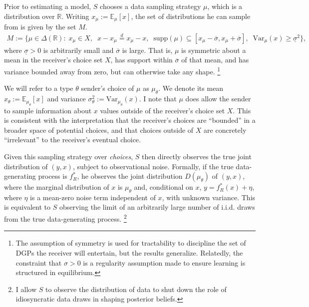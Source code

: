 \documentclass[11pt,dvipsnames]{article}
\newcommand{\Var}{\mathrm{Var}}
\begin{document}
Prior to estimating a model, $S$ chooses a data sampling strategy $\mu$, which is a distribution over $\mathbb{R}$.
Writing $x_\mu := \mathbb{E}_\mu[x]$, the set of distributions he can sample from is given by the set $M$.
\begin{align*}
M := \Big\{\mu \in \Delta(\mathbb{R}) : \; x_\mu \in X,\;\; x - x_\mu \overset{d}{=} x_\mu - x,\;\; \mathrm{supp}(\mu)\subseteq[x_\mu-\overline{\sigma},x_\mu+\overline{\sigma}],\;\; \Var_\mu(x) \geq \underline{\sigma}^2 \Big\},
\end{align*}
where $\underline{\sigma}>0$ is arbitrarily small and $\overline{\sigma}$ is large.
That is, $\mu$ is symmetric about a mean in the receiver's choice set $X$, has support within $\overline{\sigma}$ of that mean, and has variance bounded away from zero, but can otherwise take any shape.
\footnote{The assumption of symmetry is used for tractability to discipline the set of DGPs the receiver will entertain, but the results generalize. Relatedly, the constraint that $\sigma>0$ is a regularity assumption made to ensure learning is structured in equilibrium.}

We will refer to a type $\theta$ sender's choice of $\mu$ as $\mu_\theta$. We denote its mean $x_\theta := \mathbb{E}_{\mu_\theta}[x]$ and variance $\sigma_\theta^2:=\Var_{\mu_\theta}(x)$.
I note that $\mu$ does allow the sender to sample information about $x$ values outside of the receiver's choice set $X$.
This is consistent with the interpretation that the receiver's choices are ``bounded'' in a broader space of potential choices, and that choices outside of $X$ are concretely ``irrelevant'' to the receiver's eventual choice.


Given this sampling strategy over \emph{choices}, $S$ then directly observes the true joint distribution of $(y,x)$, subject to observational noise.
Formally, if the true data-generating process is $f_R^*$, he observes the joint distribution $D(\mu_\theta)$ of $(y,x)$, where the marginal distribution of $x$ is $\mu_\theta$ and, conditional on $x$,
$y = f_R^*(x)+\eta$, where $\eta$ is a mean-zero noise term independent of $x$, with unknown variance.
This is equivalent to $S$ observing the limit of an arbitrarily large number of i.i.d. draws from the true data-generating process.
\footnote{I allow $S$ to observe the distribution of data to shut down the role of idiosyncratic data draws in shaping posterior beliefs.}
\end{document}
